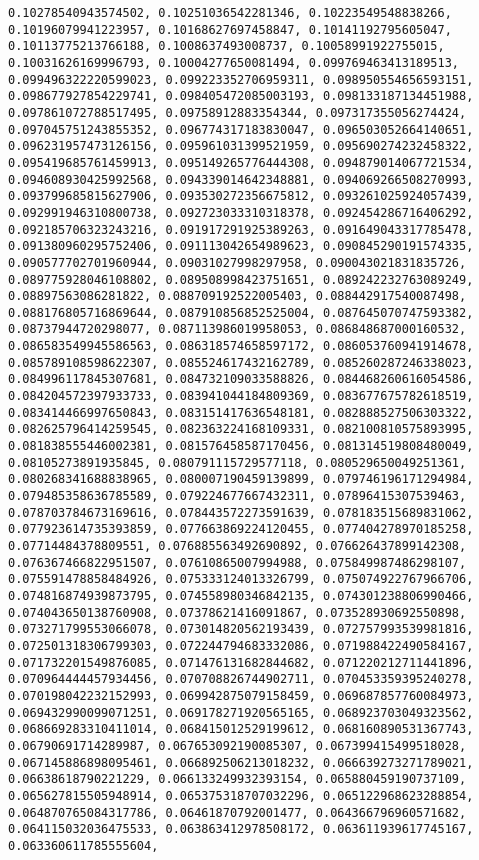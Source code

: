 \documentclass[11pt]{article}
\begin{document}
\begin{Verbatim}[commandchars=\\\{\}]
0.10278540943574502, 0.10251036542281346, 0.10223549548838266, 0.10196079941223957, 0.10168627697458847, 0.10141192795605047, 0.10113775213766188, 0.1008637493008737, 0.10058991922755015, 0.10031626169996793, 0.10004277650081494, 0.099769463413189513, 0.099496322220599023, 0.099223352706959311, 0.098950554656593151, 0.098677927854229741, 0.098405472085003193, 0.098133187134451988, 0.097861072788517495, 0.09758912883354344, 0.097317355056274424, 0.097045751243855352, 0.096774317183830047, 0.096503052664140651, 0.096231957473126156, 0.095961031399521959, 0.095690274232458322, 0.095419685761459913, 0.095149265776444308, 0.094879014067721534, 0.094608930425992568, 0.094339014642348881, 0.094069266508270993, 0.093799685815627906, 0.093530272356675812, 0.093261025924057439, 0.092991946310800738, 0.092723033310318378, 0.092454286716406292, 0.092185706323243216, 0.091917291925389263, 0.091649043317785478, 0.091380960295752406, 0.091113042654989623, 0.090845290191574335, 0.090577702701960944, 0.09031027998297958, 0.090043021831835726, 0.089775928046108802, 0.089508998423751651, 0.089242232763089249, 0.08897563086281822, 0.088709192522005403, 0.088442917540087498, 0.088176805716869644, 0.087910856852525004, 0.087645070747593382, 0.08737944720298077, 0.087113986019958053, 0.086848687000160532, 0.086583549945586563, 0.086318574658597172, 0.086053760941914678, 0.085789108598622307, 0.085524617432162789, 0.085260287246338023, 0.084996117845307681, 0.084732109033588826, 0.084468260616054586, 0.084204572397933733, 0.083941044184809369, 0.083677675782618519, 0.083414466997650843, 0.083151417636548181, 0.082888527506303322, 0.082625796414259545, 0.082363224168109331, 0.082100810575893995, 0.081838555446002381, 0.081576458587170456, 0.081314519808480049, 0.08105273891935845, 0.080791115729577118, 0.080529650049251361, 0.080268341688838965, 0.080007190459139899, 0.079746196171294984, 0.079485358636785589, 0.079224677667432311, 0.07896415307539463, 0.078703784673169616, 0.078443572273591639, 0.078183515689831062, 0.077923614735393859, 0.077663869224120455, 0.077404278970185258, 0.07714484378809551, 0.076885563492690892, 0.076626437899142308, 0.076367466822951507, 0.07610865007994988, 0.075849987486298107, 0.075591478858484926, 0.075333124013326799, 0.075074922767966706, 0.074816874939873795, 0.074558980346842135, 0.074301238806990466, 0.074043650138760908, 0.07378621416091867, 0.073528930692550898, 0.073271799553066078, 0.073014820562193439, 0.072757993539981816, 0.072501318306799303, 0.072244794683332086, 0.071988422490584167, 0.071732201549876085, 0.071476131682844682, 0.071220212711441896, 0.070964444457934456, 0.070708826744902711, 0.070453359395240278, 0.070198042232152993, 0.069942875079158459, 0.069687857760084973, 0.069432990099071251, 0.069178271920565165, 0.068923703049323562, 0.068669283310411014, 0.068415012529199612, 0.068160890531367743, 0.06790691714289987, 0.067653092190085307, 0.067399415499518028, 0.067145886898095461, 0.066892506213018232, 0.066639273271789021, 0.06638618790221229, 0.066133249932393154, 0.065880459190737109, 0.065627815505948914, 0.065375318707032296, 0.065122968623288854, 0.064870765084317786, 0.06461870792001477, 0.064366796960571682, 0.064115032036475533, 0.063863412978508172, 0.063611939617745167, 0.063360611785555604, 
\end{Verbatim}
\end{document}
